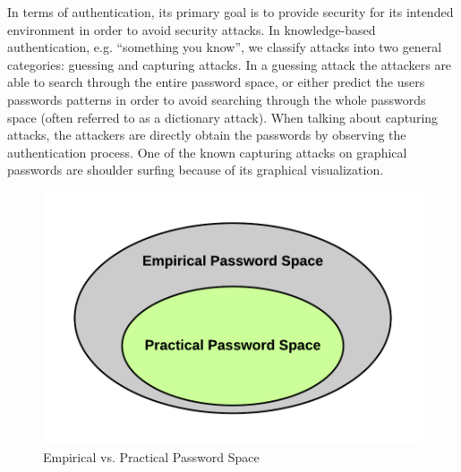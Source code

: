     In terms of authentication, its primary goal is to provide security for its intended environment in order to avoid security attacks. In knowledge-based authentication, e.g. ``something you know'', we classify attacks into two general categories: guessing and capturing attacks. In a guessing attack the attackers are able to search through the entire password space, or either predict the users passwords patterns in order to avoid searching through the whole passwords space (often referred to as a dictionary attack). When talking about capturing attacks, the attackers are directly obtain the passwords by observing the authentication process. One of the known capturing attacks on graphical passwords are shoulder surfing because of its graphical visualization.  



    \begin{figure}
      \vspace{-20pt}
      \begin{center}
        \includegraphics[scale=0.16]{pics/EmpiricalVsPractical.png}
      \end{center}
      \vspace{-20pt}
      \caption{Empirical vs. Practical Password Space}
      \vspace{0pt}
    \end{figure}

